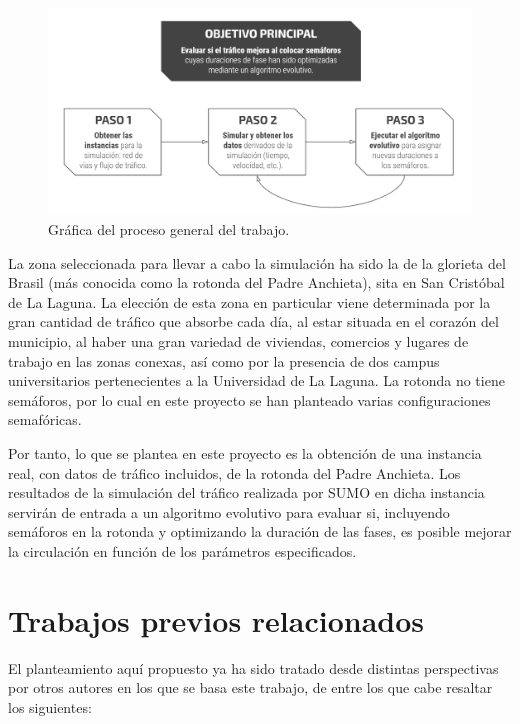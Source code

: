 \begin{figure}[!t]
    \centering
    \includegraphics[width=\textwidth]{report/images/evolutionary_alg_graph.png}
    \caption{Gráfica del proceso general del trabajo.}
    \label{fig:evolutionary_alg_graph}
\end{figure}

La zona seleccionada para llevar a cabo la simulación ha sido la de la glorieta del Brasil (más conocida como la rotonda del Padre Anchieta), sita en San Cristóbal de La Laguna. La elección de esta zona en particular viene determinada por la gran cantidad de tráfico que absorbe cada día, al estar situada en el corazón del municipio, al haber una gran variedad de viviendas, comercios y lugares de trabajo en las zonas conexas, así como por la presencia de dos campus universitarios pertenecientes a la Universidad de La Laguna. La rotonda no tiene semáforos, por lo cual en este proyecto se han planteado varias configuraciones semafóricas.

Por tanto, lo que se plantea en este proyecto es la obtención de una instancia real, con datos de tráfico incluidos, de la rotonda del Padre Anchieta. Los resultados de la simulación del tráfico realizada por SUMO en dicha instancia servirán de entrada a un algoritmo evolutivo para evaluar si, incluyendo semáforos en la rotonda y optimizando la duración de las fases, es posible mejorar la circulación en función de los parámetros especificados.


\section{Trabajos previos relacionados}

El planteamiento aquí propuesto ya ha sido tratado desde distintas perspectivas por otros autores en los que se basa este trabajo, de entre los que cabe resaltar los siguientes:

